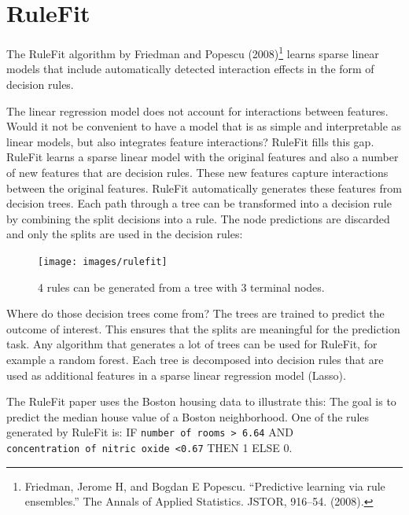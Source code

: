 \documentclass[
  12pt,
]{krantz}
\begin{document}
\newpage

\hypertarget{rulefit}{%
\section{RuleFit}\label{rulefit}}

The RuleFit algorithm by Friedman and Popescu (2008)\footnote{Friedman, Jerome H, and Bogdan E Popescu. ``Predictive learning via rule ensembles.'' The Annals of Applied Statistics. JSTOR, 916--54. (2008).} learns sparse linear models that include automatically detected interaction effects in the form of decision rules.

The linear regression model does not account for interactions between features.
Would it not be convenient to have a model that is as simple and interpretable as linear models, but also integrates feature interactions?
RuleFit fills this gap.
RuleFit learns a sparse linear model with the original features and also a number of new features that are decision rules.
These new features capture interactions between the original features.
RuleFit automatically generates these features from decision trees.
Each path through a tree can be transformed into a decision rule by combining the split decisions into a rule.
The node predictions are discarded and only the splits are used in the decision rules:

\begin{figure}

{\centering \texttt{[image: images/rulefit]} 

}

\caption{4 rules can be generated from a tree with 3 terminal nodes.}\label{fig:rulefit-split}
\end{figure}

Where do those decision trees come from?
The trees are trained to predict the outcome of interest.
This ensures that the splits are meaningful for the prediction task.
Any algorithm that generates a lot of trees can be used for RuleFit, for example a random forest.
Each tree is decomposed into decision rules that are used as additional features in a sparse linear regression model (Lasso).

The RuleFit paper uses the Boston housing data to illustrate this:
The goal is to predict the median house value of a Boston neighborhood.
One of the rules generated by RuleFit is:
IF \texttt{number\ of\ rooms\ \textgreater{}\ 6.64} AND \texttt{concentration\ of\ nitric\ oxide\ \textless{}0.67} THEN 1 ELSE 0.
\end{document}
